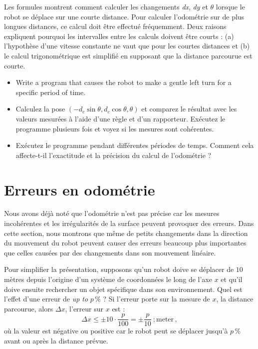 {Les formules montrent comment calculer les changements \textit{dx}, \textit{dy} et $\theta$ lorsque le robot se déplace sur une courte distance. Pour calculer l'odométrie sur de plus longues distances, ce calcul doit être effectué fréquemment. Deux raisons expliquent pourquoi les intervalles entre les calculs doivent être courts : (a) l'hypothèse d'une vitesse constante ne vaut que pour les courtes distances et (b) le calcul trigonométrique est simplifié en supposant que la distance parcourue est courte.

\begin{framed}
\begin{itemize}
\item Write a program that causes the robot to make a gentle left turn for a specific period of time.
\item Calculez la pose $( - d_c \sin \theta, d_c \cos \theta, \theta)$ et comparez le résultat avec les valeurs mesurées à l'aide d'une règle et d'un rapporteur. Exécutez le programme plusieurs fois et voyez si les mesures sont cohérentes.
\item Exécutez le programme pendant différentes périodes de temps. Comment cela affecte-t-il l'exactitude et la précision du calcul de l'odométrie ?
\end{itemize}
\end{framed}

\section{Erreurs en odométrie}\label{s.odometry-errors}

Nous avons déjà noté que l'odométrie n'est pas précise car les mesures incohérentes et les irrégularités de la surface peuvent provoquer des erreurs. Dans cette section, nous montrons que même de petits changements dans la direction du mouvement du robot peuvent causer des erreurs beaucoup plus importantes que celles causées par des changements dans son mouvement linéaire.

Pour simplifier la présentation, supposons qu'un robot doive se déplacer de $10$ mètres depuis l'origine d'un système de coordonnées le long de l'axe $x$ et qu'il doive ensuite rechercher un objet spécifique dans son environnement. Quel est l'effet d'une erreur de \emph{up to} $p\,\%$ ? Si l'erreur porte sur la mesure de $x$, la distance parcourue, alors $\Delta x$, l'erreur sur $x$ est :
\[\Delta x \leq \pm 10\cdot\frac{p}{100} = \pm\frac{p}{10}\ ; \textrm{meter}\,,\]
où la valeur est négative ou positive car le robot peut se déplacer jusqu'à $p\,\%$ avant ou après la distance prévue.

}
